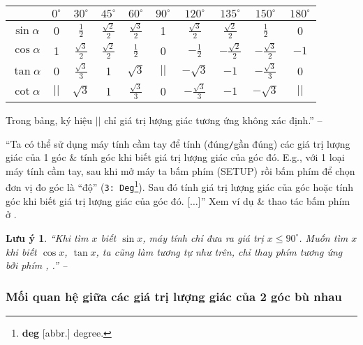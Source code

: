 \documentclass{article}
\numberwithin{equation}{section}
\newtheorem{remark}{Lưu ý}[section]
\begin{document}
\begin{table}[H]
	\centering
	\begin{tabular}{|c|c|c|c|c|c|c|c|c|c|}
		\hline
		& $0^\circ$ & $30^\circ$ & $45^\circ$ & $60^\circ$ & $90^\circ$ & $120^\circ$ & $135^\circ$ & $150^\circ$ & $180^\circ$ \\
		\hline
		$\sin\alpha$ & 0 & $\frac{1}{2}$ & $\frac{\sqrt{2}}{2}$ & $\frac{\sqrt{3}}{2}$ & 1 & $\frac{\sqrt{3}}{2}$ & $\frac{\sqrt{2}}{2}$ & $\frac{1}{2}$ & 0 \\
		\hline
		$\cos\alpha$ & 1 & $\frac{\sqrt{3}}{2}$ & $\frac{\sqrt{2}}{2}$ & $\frac{1}{2}$ & 0 & $-\frac{1}{2}$ & $-\frac{\sqrt{2}}{2}$ & $-\frac{\sqrt{3}}{2}$ & $-1$ \\
		\hline
		$\tan\alpha$ & 0 & $\frac{\sqrt{3}}{3}$ & 1 & $\sqrt{3}$ & $||$ & $-\sqrt{3}$ & $-1$ & $-\frac{\sqrt{3}}{3}$ & 0 \\
		\hline
		$\cot\alpha$ & $||$ & $\sqrt{3}$ & 1 & $\frac{\sqrt{3}}{3}$ & 0 & $-\frac{\sqrt{3}}{3}$ & $-1$ & $-\sqrt{3}$ & $||$ \\
		\hline
	\end{tabular}
\end{table}
Trong bảng, ký hiệu $||$ chỉ giá trị lượng giác tương ứng không xác định.'' -- \cite[p. 34]{Khoai_Anh_Tan_Thang_Anh_Cuong_Duong_Dang_Ha_Hanh_Hong_Son_Tuan_Vuong_Toan_10_tap_1}

``Ta có thể sử dụng máy tính cầm tay để tính (đúng\texttt{/}gần đúng) các giá trị lượng giác của 1 góc \& tính góc khi biết giá trị lượng giác của góc đó. E.g., với 1 loại máy tính cầm tay, sau khi mở máy ta bấm phím   (SETUP) rồi bấm phím  để chọn đơn vị đo góc là ``độ'' (\texttt{3: Deg}\footnote{\textbf{deg} [abbr.] degree.}). Sau đó tính giá trị lượng giác của góc hoặc tính góc khi biết giá trị lượng giác của góc đó. [$\ldots$]'' Xem ví dụ \& thao tác bấm phím ở \cite[p. 35]{Khoai_Anh_Tan_Thang_Anh_Cuong_Duong_Dang_Ha_Hanh_Hong_Son_Tuan_Vuong_Toan_10_tap_1}.

\begin{remark}
	``Khi tìm $x$ biết $\sin x$, máy tính chỉ đưa ra giá trị $x\le 90^\circ$. Muốn tìm $x$ khi biết $\cos x$, $\tan x$, ta cũng làm tương tự như trên, chỉ thay phím  tương ứng bởi phím , .'' -- \cite[p. 35]{Khoai_Anh_Tan_Thang_Anh_Cuong_Duong_Dang_Ha_Hanh_Hong_Son_Tuan_Vuong_Toan_10_tap_1}
\end{remark}

\subsubsection{Mối quan hệ giữa các giá trị lượng giác của 2 góc bù nhau}
\end{document}
